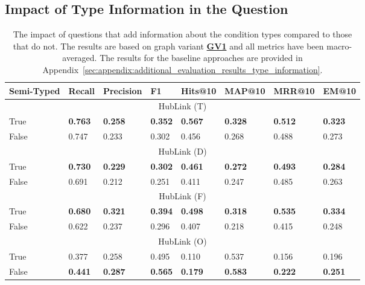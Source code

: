 \subsection{Impact of Type Information in the Question}


\begin{table}[t]
\centering
\begin{tabular}{@{}llllllll@{}}
\toprule
Semi-Typed & Recall & Precision & F1 & Hits@10 & MAP@10 & MRR@10 & EM@10 \\ 
\midrule
\multicolumn{8}{c}{HubLink (T)} \\
\midrule
True & \textbf{0.763} & \textbf{0.258} & \textbf{0.352} & \textbf{0.567} & \textbf{0.328} & \textbf{0.512} & \textbf{0.323} \\ 
False & 0.747 & 0.233 & 0.302 & 0.456 & 0.268 & 0.488 & 0.273 \\ 
\midrule
\multicolumn{8}{c}{HubLink (D)} \\
\midrule
True & \textbf{0.730} & \textbf{0.229} & \textbf{0.302} & \textbf{0.461} & \textbf{0.272} & \textbf{0.493} & \textbf{0.284} \\ 
False & 0.691 & 0.212 & 0.251 & 0.411 & 0.247 & 0.485 & 0.263 \\ 
\midrule
\multicolumn{8}{c}{HubLink (F)} \\
\midrule
True & \textbf{0.680} & \textbf{0.321} & \textbf{0.394} & \textbf{0.498} & \textbf{0.318} & \textbf{0.535} & \textbf{0.334} \\ 
False & 0.622 & 0.237 & 0.296 & 0.407 & 0.218 & 0.415 & 0.248 \\ 
\midrule
\multicolumn{8}{c}{HubLink (O)} \\
\midrule
True & 0.377 & 0.258 & 0.495 & 0.110 & 0.537 & 0.156 & 0.196 \\ 
False & \textbf{0.441} & \textbf{0.287} & \textbf{0.565} & \textbf{0.179} & \textbf{0.583} & \textbf{0.222} & \textbf{0.251} \\ 
\bottomrule
\end{tabular}%
\caption[Results of Semi-Typed Questions on Retrieval Performance]{The impact of questions that add information about the condition types compared to those that do not. The results are based on graph variant \hyperref[enum:gv1]{\textbf{GV1}} and all metrics have been macro-averaged. The results for the baseline approaches are provided in Appendix~\ref{sec:appendix:additional_evaluation_results_type_information}.}
\label{tab:q14:semi_typed}
\end{table}

